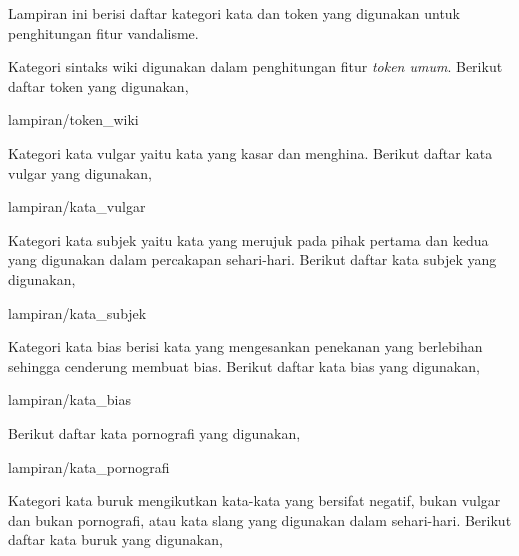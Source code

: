 	\label{lampiran:daftar_token_dan_kata}

Lampiran ini berisi daftar kategori kata dan token yang digunakan untuk
penghitungan fitur vandalisme.

	\label{lampiran:words_wiki_token}

Kategori sintaks wiki digunakan dalam penghitungan fitur \textit{token umum}.
Berikut daftar token yang digunakan,

	
		{lampiran/token_wiki}

\label{lampiran:words_vulgar}

Kategori kata vulgar yaitu kata yang kasar dan menghina.
Berikut daftar kata vulgar yang digunakan,

	
		{lampiran/kata_vulgar}

\label{lampiran:words_pronoun}

Kategori kata subjek yaitu kata yang merujuk pada pihak pertama dan kedua yang
digunakan dalam percakapan sehari-hari.
Berikut daftar kata subjek yang digunakan,

	
		{lampiran/kata_subjek}

\label{lampiran:words_bias}

Kategori kata bias berisi kata yang mengesankan penekanan yang berlebihan
sehingga cenderung membuat bias.
Berikut daftar kata bias yang digunakan,

	
		{lampiran/kata_bias}

\label{lampiran:words_sex}

Berikut daftar kata pornografi yang digunakan,

	
		{lampiran/kata_pornografi}

\label{lampiran:words_bad}

Kategori kata buruk mengikutkan kata-kata yang bersifat negatif, bukan vulgar
dan bukan pornografi, atau kata slang yang digunakan dalam sehari-hari.
Berikut daftar kata buruk yang digunakan,

